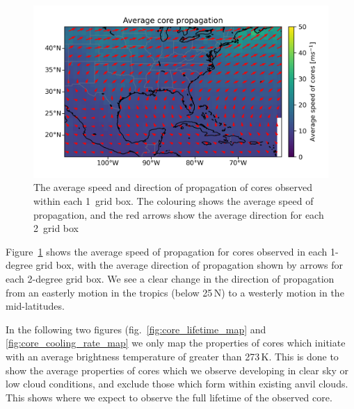 \begin{figure}[tp]
    \centering
    \includegraphics[width=\textwidth]{figures/chapter2_05.png}
    \caption[
    The average speed and direction of propagation of cores
    ]{
    The average speed and direction of propagation of cores observed within each 1\textdegree\ grid box. The colouring shows the average speed of propagation, and the red arrows show the average direction for each 2\textdegree\ grid box}
    \label{fig:core_propagation_map}
\end{figure}

Figure~\ref{fig:core_propagation_map} shows the average speed of propagation for cores observed in each 1-degree grid box, with the average direction of propagation shown by arrows for each 2-degree grid box.
We see a clear change in the direction of propagation from an easterly motion in the tropics (below 25\,\textdegree N) to a westerly motion in the mid-latitudes.


In the following two figures (fig.~\ref{fig:core_lifetime_map} and \ref{fig:core_cooling_rate_map} we only map the properties of cores which initiate with an average brightness temperature of greater than 273\,\unit{K}.
This is done to show the average properties of cores which we observe developing in clear sky or low cloud conditions, and exclude those which form within existing anvil clouds.
This shows where we expect to observe the full lifetime of the observed core.

